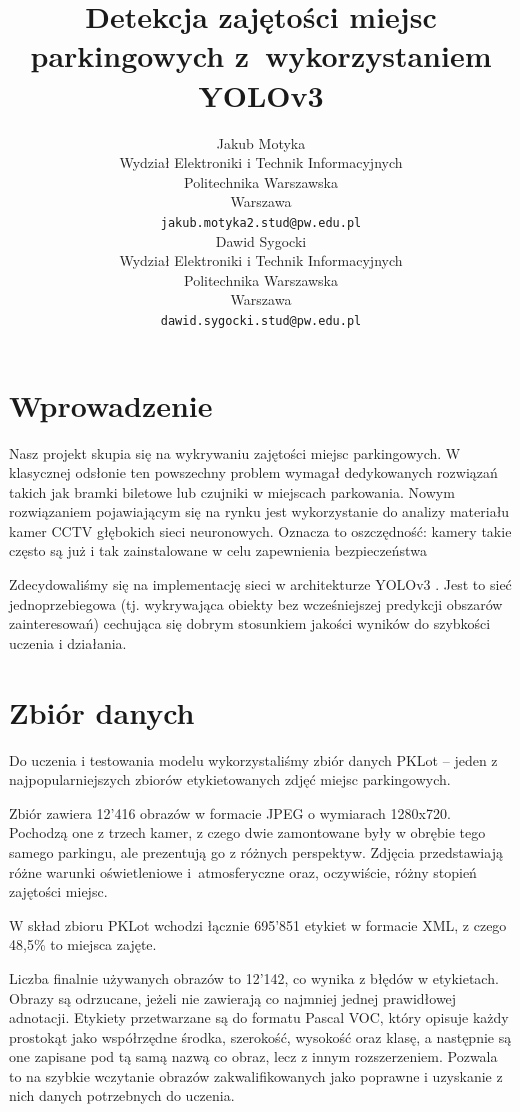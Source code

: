 \documentclass{article}
\title{Detekcja zajętości miejsc parkingowych z~wykorzystaniem YOLOv3}
\author{
    Jakub Motyka \\
	Wydział Elektroniki i Technik Informacyjnych \\
	Politechnika Warszawska \\
	Warszawa \\
	\texttt{jakub.motyka2.stud@pw.edu.pl} \\
	\And
    Dawid Sygocki \\
	Wydział Elektroniki i Technik Informacyjnych \\
	Politechnika Warszawska \\
	Warszawa \\
	\texttt{dawid.sygocki.stud@pw.edu.pl}
}
\begin{document}
\maketitle


\section{Wprowadzenie}

Nasz projekt skupia się na wykrywaniu zajętości miejsc parkingowych. W klasycznej odsłonie ten powszechny problem wymagał dedykowanych rozwiązań takich jak bramki biletowe lub czujniki w miejscach parkowania. Nowym rozwiązaniem pojawiającym się na rynku jest wykorzystanie do analizy materiału kamer CCTV głębokich sieci neuronowych. Oznacza to oszczędność: kamery takie często są już i tak zainstalowane w celu zapewnienia bezpieczeństwa

Zdecydowaliśmy się na implementację sieci w architekturze YOLOv3 \citep{redmon2018yolov3}. Jest to sieć jednoprzebiegowa (tj. wykrywająca obiekty bez wcześniejszej predykcji obszarów zainteresowań) cechująca się dobrym stosunkiem jakości wyników do szybkości uczenia i działania.

\section{Zbiór danych}

Do uczenia i testowania modelu wykorzystaliśmy zbiór danych PKLot \citep{de2015pklot} -- jeden z najpopularniejszych zbiorów etykietowanych zdjęć miejsc parkingowych.

Zbiór zawiera 12'416 obrazów w formacie JPEG o wymiarach 1280x720. Pochodzą one z trzech kamer, z czego dwie zamontowane były w obrębie tego samego parkingu, ale prezentują go z różnych perspektyw. Zdjęcia przedstawiają różne warunki oświetleniowe i~atmosferyczne oraz, oczywiście, różny stopień zajętości miejsc.

W skład zbioru PKLot wchodzi łącznie 695'851 etykiet w formacie XML, z czego 48,5\% to miejsca zajęte.

Liczba finalnie używanych obrazów to 12'142, co wynika z błędów w etykietach. Obrazy są odrzucane, jeżeli nie zawierają co najmniej jednej prawidłowej adnotacji. Etykiety przetwarzane są do formatu Pascal VOC, który opisuje każdy prostokąt jako współrzędne środka, szerokość, wysokość oraz klasę, a następnie są one zapisane pod tą samą nazwą co obraz, lecz z innym rozszerzeniem. Pozwala to na szybkie wczytanie obrazów zakwalifikowanych jako poprawne i uzyskanie z nich danych potrzebnych do uczenia.
\end{document}
